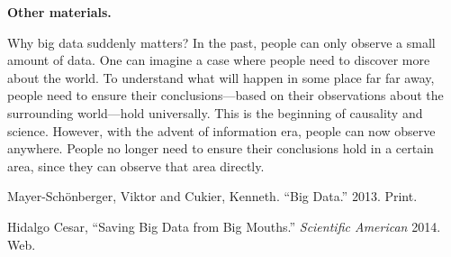 \documentclass{writing}
\begin{document}
\textbf{Other materials.}

Why big data suddenly matters? In the past, people can only observe a
small amount of data. One can imagine a case where people need to
discover more about the world. To understand what will happen in some
place far far away, people need to ensure their conclusions---based on
their observations about the surrounding world---hold universally. This
is the beginning of causality and science. However, with the advent of
information era, people can now observe anywhere. People no longer need
to ensure their conclusions hold in a certain area, since they can
observe that area directly.

\begin{references}
\item
  Mayer-Schönberger, Viktor and Cukier, Kenneth. ``Big Data.'' 2013. Print.

\item
  Hidalgo Cesar, ``Saving Big Data from Big Mouths.'' \textit{Scientific American} 2014. Web.
\end{references}
\end{document}
